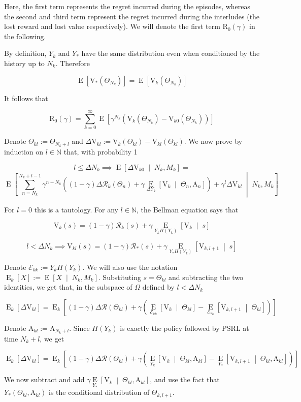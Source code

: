 \documentclass[a4paper]{article}
\newcommand{\AP}[1]{\left(#1\right)}
\newcommand{\AB}[1]{\left[#1\right]}
\newcommand{\ABM}[2]{\left[#1\;\middle\vert\;#2\right]}
\newcommand{\Ea}[2]{\underset{#1}{\operatorname{E}}\AB{#2}}
\newcommand{\CE}[3]{\underset{#1}{\operatorname{E}}\ABM{#2}{#3}}
\newcommand{\Nats}{\mathbb{N}}
\newcommand{\R}{\mathcal{R}}
\newcommand{\V}{\mathrm{V}}
\newcommand{\Reg}{\mathrm{R}}
\newcommand{\THy}{Y_*}
\newcommand{\SHy}{Y}
\newcommand{\AT}{\mathrm{A}}
\newcommand{\Ev}{\mathcal{E}}
\newcommand{\ET}{N}
\newcommand{\IT}{M}
\newcommand{\TE}[1]{{\operatorname{E}_k}\AB{#1}}
\begin{document}
Here, the first term represents the regret incurred during the episodes, whereas the second and third term represent the regret incurred during the interludes (the lost reward and lost value respectively). We will denote the first term $\Reg_0(\gamma)$ in the following.

By definition, $\SHy_{k}$ and $\SHy_*$ have the same distribution even when conditioned by the history up to $\ET_k$. Therefore

$$\Ea{}{\V_{*}\AP{\Theta_{\ET_k}}}=\Ea{}{\V_{k}\AP{\Theta_{\ET_k}}}$$

It follows that

$$\Reg_0(\gamma)=\sum_{k=0}^\infty{\Ea{}{\gamma^{\ET_k}\AP{\V_{k}\AP{\Theta_{\ET_k}}-\V_{k0}\AP{\Theta_{\ET_k}}}}}$$

Denote $\Theta_{kl}:=\Theta_{\ET_k+l}$ and $\Delta\V_{kl}:=\V_k\AP{\Theta_{kl}}-\V_{kl}\AP{\Theta_{kl}}$. We now prove by induction on $l\in\Nats$ that, with probability 1

$$l\leq\Delta\ET_k\implies\CE{}{\Delta\V_{k0}}{\ET_k,\IT_k}=$$
$$\CE{}{\sum_{n=\ET_k}^{\ET_k+l-1}\gamma^{n-\ET_k}\AP{(1-\gamma)\Delta\R_k\AP{\Theta_n}+\gamma\CE{\Delta\SHy_k}{\V_{k}}{\Theta_n,\AT_n}}+\gamma^l\Delta\V_{kl}}{\ET_k,\IT_k}$$

For $l=0$ this is a tautology. For any $l\in\Nats$, the Bellman equation says that

$$\V_k(s)=(1-\gamma)\R_k(s)+\gamma\CE{\SHy_{k}\Pi\AP{\SHy_{k}}}{\V_k}{s}$$

$$l<\Delta\ET_k\implies\V_{kl}(s)=(1-\gamma)\R_*(s)+\gamma\CE{\SHy_{*}\Pi\AP{\SHy_{k}}}{\V_{k,l+1}}{s}$$

Denote $\Ev_{kk}:=\SHy_k\Pi\AP{\SHy_k}$. We will also use the notation $\TE{X}:=\CE{}{X}{\ET_k,\IT_k}$. Substituting $s=\Theta_{kl}$ and subtracting the two identities, we get that, in the subspace of $\Omega$ defined by $l<\Delta\ET_k$

$$\TE{\Delta\V_{kl}}=\TE{(1-\gamma)\Delta\R\AP{\Theta_{kl}}+\gamma\AP{\CE{\Ev_{kk}}{\V_k}{\Theta_{kl}}-\CE{\Ev_{*k}}{\V_{k,l+1}}{\Theta_{kl}}}}$$

Denote $\AT_{kl}:=\AT_{\ET_k+l}$. Since $\Pi\AP{\SHy_{k}}$ is exactly the policy followed by PSRL at time $\ET_k+l$, we get

$$\TE{\Delta\V_{kl}}=\TE{(1-\gamma)\Delta\R\AP{\Theta_{kl}}+\gamma\AP{\CE{\SHy_k}{\V_k}{\Theta_{kl},\AT_{kl}}-\CE{\THy}{\V_{k,l+1}}{\Theta_{kl},\AT_{kl}}}}$$

We now subtract and add $\gamma\CE{\SHy_*}{\V_k}{\Theta_{kl},\AT_{kl}}$, and use the fact that $\SHy_*\AP{\Theta_{kl},\AT_{kl}}$ is the conditional distribution of $\Theta_{k,l+1}$.
\end{document}
